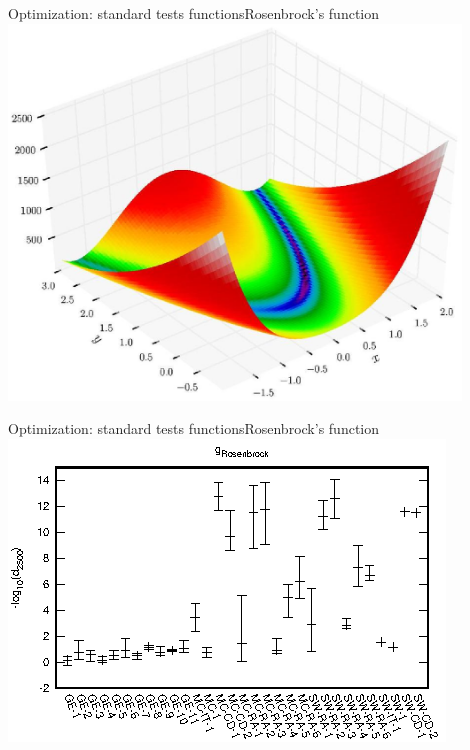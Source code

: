 \documentclass[10pt]{beamer}
\begin{document}
\begin{frame}{Optimization: standard tests functions}{Rosenbrock's function}
	\includegraphics[width=0.9\textwidth]{rosenbrock-function.eps}
\end{frame}

\begin{frame}{Optimization: standard tests functions}{Rosenbrock's function}
	\includegraphics[width=\textwidth]{Rosenbrock-e.eps}
\end{frame}
\end{document}
